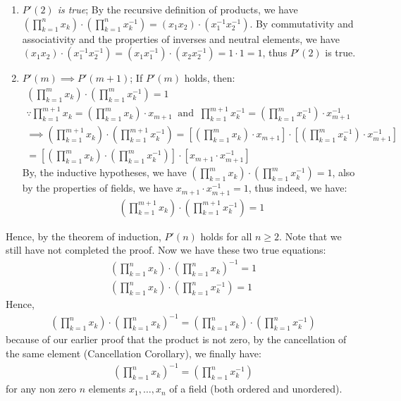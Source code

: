 \documentclass[12pt]{book}
\theoremstyle{definition}
\begin{document}
\begin{sol}
\begin{enumerate}[label=(\roman*)$'$]
	\item \textit{$P'(2)$ is true}; By the recursive definition of products, we have $(\prod_{k=1}^n x_k) \cdot (\prod_{k=1}^n x_k^{-1}) = (x_1x_2)\cdot (x_1^{-1}x_2^{-1})$. By commutativity and associativity and the properties of inverses and neutral elements, we have $(x_1x_2)\cdot (x_1^{-1}x_2^{-1}) = (x_1x_1^{-1})\cdot (x_2x_2^{-1})= 1\cdot 1 =1$, thus $P'(2)$ is true.
	\item $P'(m) \implies P'(m+1)$; If $P'(m)$ holds, then:
		\begin{gather*}
			\left(\prod_{k=1}^m x_k\right) \cdot \left(\prod_{k=1}^m x_k^{-1}\right) = 1\\
			\because \prod_{k=1}^{m+1} x_k = \left(\prod_{k=1}^m x_k\right) \cdot x_{m+1}\;\;\text{and}\;\; \prod_{k=1}^{m+1} x_k^{-1} = \left(\prod_{k=1}^m x_k^{-1}\right) \cdot x^{-1}_{m+1}\\
			\implies  \left(\prod_{k=1}^{m+1} x_k\right) \cdot \left(\prod_{k=1}^{m+1} x_k^{-1}\right) = \left[\left(\prod_{k=1}^m x_k\right) \cdot x_{m+1} \right]\cdot \left[  \left(\prod_{k=1}^m x_k^{-1}\right) \cdot x^{-1}_{m+1}\right] \\
			= \left[ \left(\prod_{k=1}^m x_k\right) \cdot \left(\prod_{k=1}^m x_k^{-1}\right)\right] \cdot [x_{m+1}\cdot x^{-1}_{m+1}]
		\end{gather*}
		By, the inductive hypotheses, we have $\left(\prod_{k=1}^m x_k\right) \cdot \left(\prod_{k=1}^m x_k^{-1}\right) =1$, also by the properties of fields, we have $x_{m+1}\cdot x^{-1}_{m+1} =1$, thus indeed, we have:
		\begin{align*}
			\left(\prod_{k=1}^{m+1} x_k\right) \cdot \left(\prod_{k=1}^{m+1} x_k^{-1}\right) = 1
		\end{align*}
\end{enumerate}
Hence, by the theorem of induction, $P'(n)$ holds for all $n\geq 2$. Note that we still have not completed the proof. Now we have these two true equations:
\begin{align*}
	\left(\prod_{k=1}^{n} x_k\right) \cdot \left(\prod_{k=1}^n x_k \right)^{-1} =1\\
	\left(\prod_{k=1}^{n} x_k\right) \cdot \left(\prod_{k=1}^{n} x_k^{-1}\right) = 1
\end{align*}
Hence, 
\begin{align*}
 \left(\prod_{k=1}^{n} x_k\right) \cdot \left(\prod_{k=1}^n x_k \right)^{-1} = 	\left(\prod_{k=1}^{n} x_k\right) \cdot \left(\prod_{k=1}^{n} x_k^{-1}\right)
\end{align*}
because of our earlier proof that the product is not zero, by the cancellation of the same element (Cancellation Corollary), we finally have:
\begin{align*}
	\left(\prod_{k=1}^n x_k \right)^{-1} = \left(\prod_{k=1}^{n} x_k^{-1}\right)
\end{align*}
for any non zero $n$ elements $x_1,\ldots, x_n$ of a field (both ordered and unordered).   
\end{sol}
\end{document}
